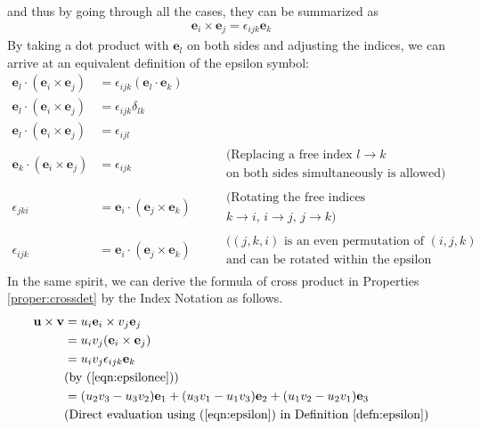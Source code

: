 and thus by going through all the cases, they can be summarized as
\begin{align}
\textbf{e}_i \times \textbf{e}_j= \epsilon_{ijk} \textbf{e}_k \label{eqn:epsilonee}
\end{align}
By taking a dot product with $\textbf{e}_l$ on both sides and adjusting the indices, we can arrive at an equivalent definition of the epsilon symbol:
\begin{align}
\textbf{e}_l \cdot (\textbf{e}_i \times \textbf{e}_j) &= \epsilon_{ijk} (\textbf{e}_l \cdot \textbf{e}_k)  \nonumber \\
\textbf{e}_l \cdot (\textbf{e}_i \times \textbf{e}_j) &= \epsilon_{ijk} \delta_{lk} \nonumber \\
\textbf{e}_l \cdot (\textbf{e}_i \times \textbf{e}_j) &= \epsilon_{ijl} \nonumber \\
\textbf{e}_k \cdot (\textbf{e}_i \times \textbf{e}_j) &= \epsilon_{ijk} \nonumber & &\begin{aligned}
&\text{(Replacing a free index $l \to k$} \\
&\text{on both sides simultaneously is allowed)}     
\end{aligned} \\
\epsilon_{jki} &= \textbf{e}_i \cdot (\textbf{e}_j \times \textbf{e}_k) & & \begin{aligned}
&\text{(Rotating the free indices} \\
&\text{$k \to i$, $i \to j$, $j \to k$)}    
\end{aligned}  \nonumber \\
\epsilon_{ijk} &= \textbf{e}_i \cdot (\textbf{e}_j \times \textbf{e}_k) 
& &\begin{aligned}
&\text{($(j,k,i)$ is an even permutation of $(i,j,k)$} \\
&\text{and can be rotated within the epsilon symbol)}    
\end{aligned} 
\end{align}
In the same spirit, we can derive the formula of cross product in Properties \ref{proper:crossdet} by the Index Notation as follows.
\begin{align}
\textbf{u} \times \textbf{v} &= u_i\textbf{e}_i \times v_j\textbf{e}_j \nonumber \\
&= u_iv_j (\textbf{e}_i \times \textbf{e}_j) \nonumber \\
&= u_iv_j \epsilon_{ijk} \textbf{e}_k \label{eqn:crossind} \\
& \text{(by (\ref{eqn:epsilonee}))} \nonumber \\
&= (u_2v_3 - u_3v_2)\textbf{e}_1 + (u_3v_1 - u_1v_3)\textbf{e}_2 + (u_1v_2 - u_2v_1)\textbf{e}_3 \nonumber \\
& \text{(Direct evaluation using (\ref{eqn:epsilon}) in Definition \ref{defn:epsilon})} \nonumber
\end{align}
